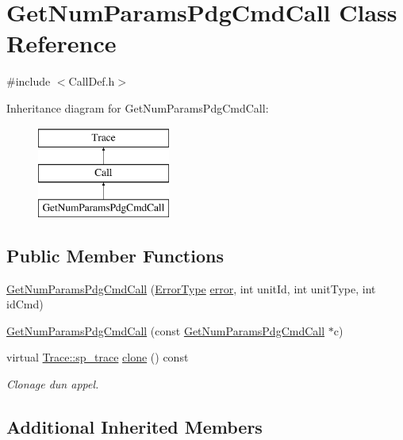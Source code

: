 \hypertarget{class_get_num_params_pdg_cmd_call}{}\section{Get\+Num\+Params\+Pdg\+Cmd\+Call Class Reference}
\label{class_get_num_params_pdg_cmd_call}


{\ttfamily \#include $<$Call\+Def.\+h$>$}

Inheritance diagram for Get\+Num\+Params\+Pdg\+Cmd\+Call\+:\begin{figure}[H]
\begin{center}
\leavevmode
\includegraphics[height=3.000000cm]{class_get_num_params_pdg_cmd_call}
\end{center}
\end{figure}
\subsection*{Public Member Functions}
\begin{DoxyCompactItemize}
\item 
\hyperlink{class_get_num_params_pdg_cmd_call_a4a3f171d64aa75248b1a75a2871bfcb4}{Get\+Num\+Params\+Pdg\+Cmd\+Call} (\hyperlink{class_call_ade833a08ce215aaa4121102f3448c898}{Error\+Type} \hyperlink{class_call_a206f6150a8038fda48c17c2c7421aed1}{error}, int unit\+Id, int unit\+Type, int id\+Cmd)
\item 
\hyperlink{class_get_num_params_pdg_cmd_call_adeba6dd73ce4e1ac191563f545d93ef4}{Get\+Num\+Params\+Pdg\+Cmd\+Call} (const \hyperlink{class_get_num_params_pdg_cmd_call}{Get\+Num\+Params\+Pdg\+Cmd\+Call} $\ast$c)
\item 
virtual \hyperlink{class_trace_a9c58e523529fc8a03fb6acf3eef86150}{Trace\+::sp\+\_\+trace} \hyperlink{class_get_num_params_pdg_cmd_call_ae0633bca77530d2e3ad5bc3a68109c8f}{clone} () const 
\begin{DoxyCompactList}\small\item\em Clonage d\textquotesingle{}un appel. \end{DoxyCompactList}\end{DoxyCompactItemize}
\subsection*{Additional Inherited Members}



